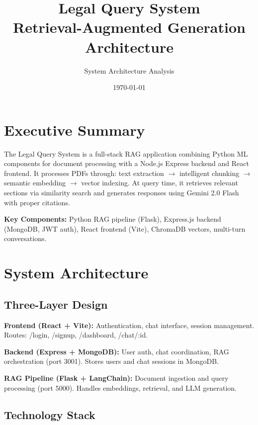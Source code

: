 \documentclass[12pt,a4paper]{article}
\title{
    \textbf{Legal Query System}\\
    \Large Retrieval-Augmented Generation Architecture
}
\author{System Architecture Analysis}
\date{\today}
\begin{document}
\maketitle
\tableofcontents

\section{Executive Summary}

The Legal Query System is a full-stack RAG application combining Python ML components for document processing with a Node.js Express backend and React frontend. It processes PDFs through: text extraction $\rightarrow$ intelligent chunking $\rightarrow$ semantic embedding $\rightarrow$ vector indexing. At query time, it retrieves relevant sections via similarity search and generates responses using Gemini 2.0 Flash with proper citations.

\textbf{Key Components:} Python RAG pipeline (Flask), Express.js backend (MongoDB, JWT auth), React frontend (Vite), ChromaDB vectors, multi-turn conversations.

\section{System Architecture}

\subsection{Three-Layer Design}

\textbf{Frontend (React + Vite):} Authentication, chat interface, session management. Routes: /login, /signup, /dashboard, /chat/:id.

\textbf{Backend (Express + MongoDB):} User auth, chat coordination, RAG orchestration (port 3001). Stores users and chat sessions in MongoDB.

\textbf{RAG Pipeline (Flask + LangChain):} Document ingestion and query processing (port 5000). Handles embeddings, retrieval, and LLM generation.

\subsection{Technology Stack}
\end{document}
